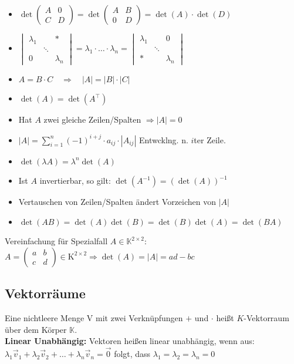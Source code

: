 \documentclass[6pt,a4paper]{scrartcl}
\newcommand{\C}{\ensuremath{\mathbb C}}
\begin{document}
\begin{multicols}{4}
\begin{itemize}\itemsep0pt
\item $\det\begin{pmatrix}A&0\\C&D\end{pmatrix}=\det\begin{pmatrix}A&B\\0&D\end{pmatrix}=\det(A)\cdot\det(D)$
\item $\begin{vmatrix}\lambda_1&&* \\ &\ddots& \\ 0&&\lambda_n \end{vmatrix} = \lambda_1\cdot \ldots\cdot \lambda_n = \begin{vmatrix} \lambda_1&&0  \\  &\ddots& \\  *&&\lambda_n \end{vmatrix}$
\item $A=B \cdot C \quad \Rightarrow \quad |A|=|B| \cdot |C|$
\item $\det(A)=\det(A^\top)$
\item Hat $A$ zwei gleiche Zeilen/Spalten $\Rightarrow |A|=0$
\item $|A|=\sum\limits_{i=1}^n (-1)^{i+j} \cdot a_{ij} \cdot |A_{ij}|$ \qquad Entwcklng. n. $i$ter Zeile.
\item $\det(\lambda A)=\lambda^n \det(A)$
\item Ist $A$ invertierbar, so gilt: $\det(A^{-1})=(\det(A))^{-1}$
\item Vertauschen von Zeilen/Spalten ändert Vorzeichen von $|A|$
\item $\det(AB) = \det(A) \det(B) = \det(B) \det(A) = \det(BA)$
\end{itemize}
Vereinfachung für Spezialfall $A\in \mathbb K^{2\times 2}$:\\
$A=\begin{pmatrix}a&b\\c&d\end{pmatrix}\in \mathrm{K}^{2\times 2}\Rightarrow \det(A)=|A|=ad-bc$






\subsection{Vektorräume}
Eine nichtleere Menge V mit zwei Verknüpfungen $+$ und $\cdot$ heißt $K$-Vektorraum über dem Körper $\mathbb K$.\\
\textbf{Linear Unabhängig:}
Vektoren heißen linear unabhängig, wenn aus: \\
$\lambda_1 \vec v_1 + \lambda_2 \vec v_2 + \ldots + \lambda_n \vec v_n = \vec 0$ folgt, dass $\lambda_1 = \lambda_2 = \lambda_n = 0$

\end{multicols}
\end{document}
